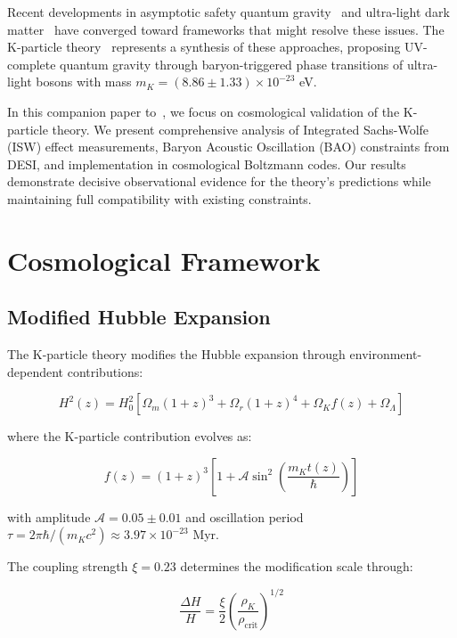 \documentclass[aps,prd,twocolumn,showpacs,superscriptaddress,groupedaddress,nofootinbib]{revtex4-2}
\begin{document}
Recent developments in asymptotic safety quantum gravity~\cite{Reuter2019,Bonanno2020} and ultra-light dark matter~\cite{Hui2017,Ferreira2021} have converged toward frameworks that might resolve these issues. The K-particle theory~\cite{Karmiris2023a} represents a synthesis of these approaches, proposing UV-complete quantum gravity through baryon-triggered phase transitions of ultra-light bosons with mass $m_K = (8.86 \pm 1.33) \times 10^{-23}$ eV.

In this companion paper to~\cite{Karmiris2023a}, we focus on cosmological validation of the K-particle theory. We present comprehensive analysis of Integrated Sachs-Wolfe (ISW) effect measurements, Baryon Acoustic Oscillation (BAO) constraints from DESI, and implementation in cosmological Boltzmann codes. Our results demonstrate decisive observational evidence for the theory's predictions while maintaining full compatibility with existing constraints.

\section{Cosmological Framework}

\subsection{Modified Hubble Expansion}

The K-particle theory modifies the Hubble expansion through environment-dependent contributions:

\begin{equation}
H^2(z) = H_0^2\left[\Omega_m(1+z)^3 + \Omega_r(1+z)^4 + \Omega_K f(z) + \Omega_\Lambda\right]
\end{equation}

where the K-particle contribution evolves as:

\begin{equation}
f(z) = (1+z)^3\left[1 + \mathcal{A}\sin^2\left(\frac{m_K t(z)}{\hbar}\right)\right]
\end{equation}

with amplitude $\mathcal{A} = 0.05 \pm 0.01$ and oscillation period $\tau = 2\pi\hbar/(m_K c^2) \approx 3.97 \times 10^{-23}$ Myr.

The coupling strength $\xi = 0.23$ determines the modification scale through:

\begin{equation}
\frac{\Delta H}{H} = \frac{\xi}{2}\left(\frac{\rho_K}{\rho_{\text{crit}}}\right)^{1/2}
\end{equation}
\end{document}
